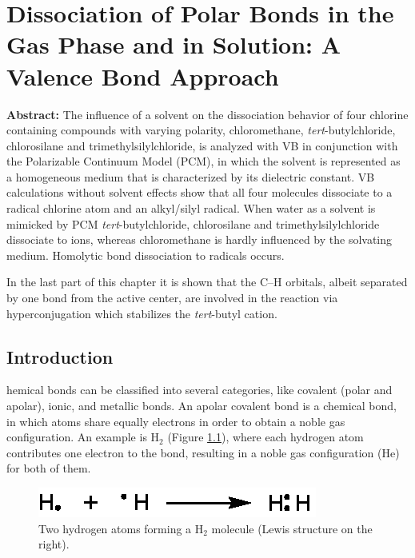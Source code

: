 \chapter{Dissociation of Polar Bonds in the Gas Phase and in Solution: A Valence Bond Approach}
\label{chap_dissociation}



\noindent\textbf{Abstract:} The influence of a solvent on the dissociation behavior of four chlorine containing compounds with varying polarity, chloromethane, \textit{tert}-butylchloride, chlorosilane and trimethylsilylchloride, is analyzed with VB in conjunction with the Polarizable Continuum Model (PCM), in which the solvent is represented as a homogeneous medium that is characterized by its dielectric constant. VB calculations without solvent effects show that all four molecules dissociate to a radical chlorine atom and an alkyl/silyl radical. When water as a solvent is mimicked by PCM \textit{tert}-butylchloride, chlorosilane and trimethylsilylchloride dissociate to ions, whereas chloromethane is hardly influenced by the solvating medium. Homolytic bond dissociation to radicals occurs.

In the last part of this chapter it is shown that the C--H orbitals, albeit separated by one bond from the active center, are involved in the reaction via hyperconjugation which stabilizes the \textit{tert}-butyl cation. 

\clearpage

\section{Introduction}

\lettrine{}{}hemical bonds can be classified into several categories, like covalent (polar and apolar), ionic, and metallic bonds. An apolar covalent bond is a chemical bond, in which atoms share equally electrons in order to obtain a noble gas configuration. An example is H$_2$ (Figure \ref{ch3.fig.h_twee}), where each hydrogen atom contributes one electron to the bond, resulting in a noble gas configuration (He) for both of them.
\begin{figure}[ht]
\center
\includegraphics{dissociation/figures/h_twee.eps}
\caption{Two hydrogen atoms forming a H$_2$ molecule (Lewis structure on the right).}
\label{ch3.fig.h_twee} 
\end{figure}


